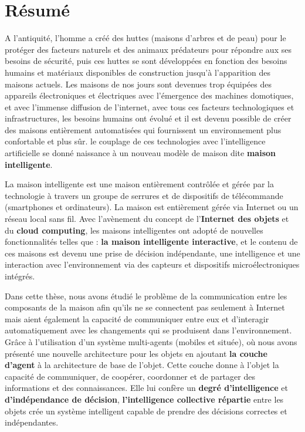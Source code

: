 
\thispagestyle{plain}
\section*{Résumé}
A l'antiquité, l'homme a créé des huttes (maisons d'arbres et de peau) pour le protéger des facteurs naturels et des animaux prédateurs pour répondre aux ses besoins de sécurité, puis ces huttes se sont développées en fonction des besoins humains et matériaux disponibles de construction jusqu'à l'apparition des maisons actuels. Les maisons de nos jours sont devenues trop équipées des appareils électroniques et électriques avec  l'émergence des machines domotiques, et avec l'immense diffusion de l’internet, avec tous ces facteurs technologiques et infrastructures, les besoins humains ont évolué et il est devenu possible de créer des maisons entièrement automatisées qui fournissent un environnement plus confortable et plus sûr. le couplage de ces technologies avec l'intelligence artificielle se donné naissance à un nouveau modèle de maison dite \textbf{maison intelligente}.


La maison intelligente est une maison entièrement contrôlée et gérée par la technologie à travers un groupe de serrures et de dispositifs de télécommande (smartphones et ordinateurs). La maison est entièrement gérée via Internet ou un réseau local sans fil. Avec l'avènement du concept de l'\textbf{Internet des objets} et du \textbf{cloud computing}, les maisons intelligentes ont adopté de nouvelles fonctionnalités telles que : \textbf{la maison intelligente interactive}, et le contenu de ces maisons est devenu une prise de décision indépendante, une intelligence et une interaction avec l'environnement via des capteurs et dispositifs microélectroniques intégrés.


Dans cette thèse, nous avons étudié le problème de la communication entre les composants de la maison afin qu'ils ne se connectent pas seulement à Internet mais aient également la capacité de communiquer entre eux et d'interagir automatiquement avec les changements qui se produisent dans l'environnement. Grâce à l'utilisation d'un système multi-agents (mobiles et située), où nous avons présenté une nouvelle architecture  pour les objets en ajoutant \textbf{la couche d'agent } à la architecture de base de l'objet. Cette couche donne à l'objet la capacité de communiquer, de coopérer, coordonner et de partager des informations et des connaissances. Elle lui confère un \textbf{degré d'intelligence} et \textbf{d'indépendance de décision},\textbf{ l'intelligence collective répartie} entre les objets crée un système intelligent capable de prendre des décisions correctes et indépendantes.
